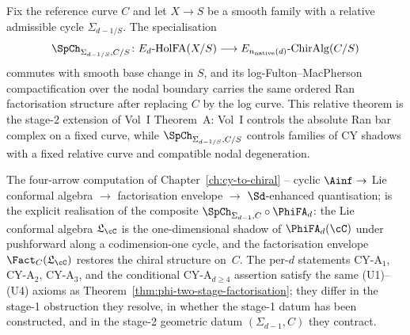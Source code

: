 \begin{theorem}
\label{thm:relative-ran-specialisation}
Fix the reference curve $C$ and let \(X\to S\) be a smooth family with a
relative admissible cycle \(\Sigma_{d-1/S}\). The specialisation
\[
 \SpCh_{\Sigma_{d-1/S},C/S}\colon
 E_d\text{-}\HolFA(X/S)\longrightarrow E_{n_{\mathrm{native}}(d)}
 \text{-}\ChirAlg(C/S)
\]
commutes with smooth base change in \(S\), and its log-Fulton--MacPherson
compactification over the nodal boundary carries the same ordered Ran
factorisation structure after replacing \(C\) by the log curve. This
relative theorem is the stage-$2$ extension of Vol~I Theorem~A: Vol~I
controls the absolute Ran bar complex on a fixed curve, while
\(\SpCh_{\Sigma_{d-1/S},C/S}\) controls families of CY shadows with a
fixed relative curve and compatible nodal degeneration.
\end{theorem}

The four-arrow computation of Chapter~\ref{ch:cy-to-chiral}
-- cyclic $\Ainf \to$ Lie conformal algebra $\to$ factorisation
envelope $\to$ $\Sd$-enhanced quantisation; is the explicit
realisation of the composite $\SpCh_{\Sigma_{d-1}, C}\circ\PhiFA_d$:
the Lie conformal algebra $\mathfrak{L}_\cC$ is the one-dimensional
shadow of $\PhiFA_d(\cC)$ under pushforward along a codimension-one
cycle, and the factorisation envelope $\Fact_C(\mathfrak{L}_\cC)$
restores the chiral structure on~$C$. The per-$d$ statements
CY-A$_1$, CY-A$_2$, CY-A$_3$, and the conditional CY-A$_{d \ge 4}$
assertion satisfy the same (U1)--(U4) axioms as
Theorem~\ref{thm:phi-two-stage-factorisation}; they differ in the
stage-1 obstruction they resolve, in whether the stage-1 datum has
been constructed, and in the stage-2 geometric datum
$(\Sigma_{d-1}, C)$ they contract.

